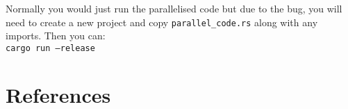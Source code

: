 Normally you would just run the parallelised code but due to the bug, you will need to create a new project and copy \texttt{parallel\_code.rs} along with any imports. Then you can: \\
\texttt{cargo run --release}

\section{References}
\printbibliography[heading=none]

%
%
